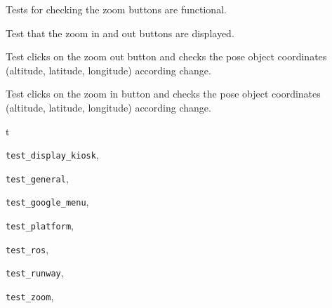 \documentclass[letterpaper,10pt,english]{sphinxmanual}
\begin{document}
\begin{fulllineitems}
\label{test_zoom:test_zoom.TestZoomButtons}
Tests for checking the zoom buttons are functional.

\begin{fulllineitems}
\label{test_zoom:test_zoom.TestZoomButtons.test_zoom_buttons}
Test that the zoom in and out buttons are displayed.

\end{fulllineitems}


\begin{fulllineitems}
\label{test_zoom:test_zoom.TestZoomButtons.test_zoom_in_button_change}
Test clicks on the zoom out button and checks the
pose object coordinates (altitude, latitude, longitude)
according change.

\end{fulllineitems}


\begin{fulllineitems}
\label{test_zoom:test_zoom.TestZoomButtons.test_zoom_out_button_change}
Test clicks on the zoom in button and checks the
pose object coordinates (altitude, latitude, longitude)
according change.

\end{fulllineitems}


\end{fulllineitems}



\renewcommand{\indexname}{Python Module Index}
\begin{theindex}
\def\bigletter#1{{\Large\sffamily#1}\nopagebreak\vspace{1mm}}
\bigletter{t}
\item {\texttt{test\_display\_kiosk}}, \pageref{test_display_kiosk:module-test_display_kiosk}
\item {\texttt{test\_general}}, \pageref{test_general:module-test_general}
\item {\texttt{test\_google\_menu}}, \pageref{test_google_menu:module-test_google_menu}
\item {\texttt{test\_platform}}, \pageref{test_platform:module-test_platform}
\item {\texttt{test\_ros}}, \pageref{test_ros:module-test_ros}
\item {\texttt{test\_runway}}, \pageref{test_runway:module-test_runway}
\item {\texttt{test\_zoom}}, \pageref{test_zoom:module-test_zoom}
\end{theindex}

\renewcommand{\indexname}{Index}
\printindex
\end{document}
